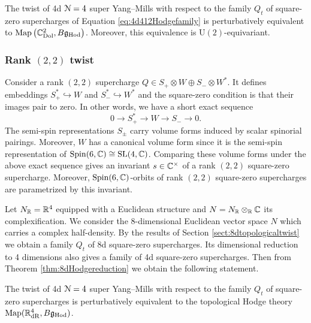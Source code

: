 \documentclass[10pt, oneside]{article}
\newcommand{\Hod}{\mathrm{Hod}}
\renewcommand{\U}{\mathrm{U}}
\begin{document}
\begin{theorem}
The twist of 4d $\mathcal N=4$ super Yang--Mills with respect to the family $Q_t$ of square-zero supercharges of Equation \ref{eq:4d412Hodgefamily} is perturbatively equivalent to $\map\left(\CC^2_{\rm Dol}, B\fg_{\Hod}\right)$. Moreover, this equivalence is $\U(2)$-equivariant.
\label{thm:4d12hodge}
\end{theorem}

\subsubsection{Rank \texorpdfstring{$(2, 2)$}{(2,2)} twist}
\label{sect:4dqgltwist}

Consider a rank $(2, 2)$ supercharge $Q\in S_+\otimes W\oplus S_-\otimes W^*$. It defines embeddings $S_+^*\hookrightarrow W$ and $S_-^*\hookrightarrow W^*$ and the square-zero condition is that their images pair to zero. In other words, we have a short exact sequence
\[0\longrightarrow S_+^*\longrightarrow W\longrightarrow S_-\longrightarrow 0.\]
The semi-spin representations $S_\pm$ carry volume forms induced by scalar spinorial pairings. Moreover, $W$ has a canonical volume form since it is the semi-spin representation of $\mathrm{Spin}(6, \mathbb C)\cong \mathrm{SL}(4, \mathbb C)$. Comparing these volume forms under the above exact sequence gives an invariant $s\in\mathbb C^\times$ of a rank $(2, 2)$ square-zero supercharge. Moreover, $\mathrm{Spin}(6, \mathbb C)$-orbits of rank $(2, 2)$ square-zero supercharges are parametrized by this invariant.

Let $N_\mathbb R=\mathbb R^4$ equipped with a Euclidean structure and $N=N_\mathbb R\otimes_\mathbb R\mathbb C$ its complexification. We consider the 8-dimensional Euclidean vector space $N$ which carries a complex half-density. By the results of Section \ref{sect:8dtopologicaltwist} we obtain a family $Q_t$ of 8d square-zero supercharges. Its dimensional reduction to 4 dimensions also gives a family of 4d square-zero supercharges. Then from Theorem \ref{thm:8dHodgereduction} we obtain the following statement.

\begin{theorem}
The twist of 4d $\mathcal N=4$ super Yang--Mills with respect to the family $Q_t$ of square-zero supercharges is perturbatively equivalent to the topological Hodge theory $\map(\RR^4_{\mathrm{dR}}, B\fg_{\Hod})$.
\label{thm:4d422Hodgetwist}
\end{theorem}
\end{document}
